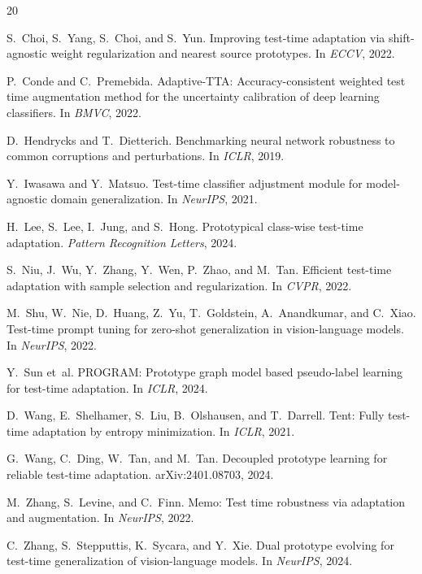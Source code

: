 \documentclass{article}
\begin{document}
\begin{small}
\begin{thebibliography}{20}

S.~Choi, S.~Yang, S.~Choi, and S.~Yun.
\newblock Improving test-time adaptation via shift-agnostic weight regularization and nearest source prototypes.
\newblock In \emph{ECCV}, 2022.

P.~Conde and C.~Premebida.
\newblock Adaptive-TTA: Accuracy-consistent weighted test time augmentation method for the uncertainty calibration of deep learning classifiers.
\newblock In \emph{BMVC}, 2022.

D.~Hendrycks and T.~Dietterich.
\newblock Benchmarking neural network robustness to common corruptions and perturbations.
\newblock In \emph{ICLR}, 2019.

Y.~Iwasawa and Y.~Matsuo.
\newblock Test-time classifier adjustment module for model-agnostic domain generalization.
\newblock In \emph{NeurIPS}, 2021.

H.~Lee, S.~Lee, I.~Jung, and S.~Hong.
\newblock Prototypical class-wise test-time adaptation.
\newblock \emph{Pattern Recognition Letters}, 2024.

S.~Niu, J.~Wu, Y.~Zhang, Y.~Wen, P.~Zhao, and M.~Tan.
\newblock Efficient test-time adaptation with sample selection and regularization.
\newblock In \emph{CVPR}, 2022.

M.~Shu, W.~Nie, D.~Huang, Z.~Yu, T.~Goldstein, A.~Anandkumar, and C.~Xiao.
\newblock Test-time prompt tuning for zero-shot generalization in vision-language models.
\newblock In \emph{NeurIPS}, 2022.

Y.~Sun et~al.
\newblock PROGRAM: Prototype graph model based pseudo-label learning for test-time adaptation.
\newblock In \emph{ICLR}, 2024.

D.~Wang, E.~Shelhamer, S.~Liu, B.~Olshausen, and T.~Darrell.
\newblock Tent: Fully test-time adaptation by entropy minimization.
\newblock In \emph{ICLR}, 2021.

G.~Wang, C.~Ding, W.~Tan, and M.~Tan.
\newblock Decoupled prototype learning for reliable test-time adaptation.
\newblock arXiv:2401.08703, 2024.

M.~Zhang, S.~Levine, and C.~Finn.
\newblock Memo: Test time robustness via adaptation and augmentation.
\newblock In \emph{NeurIPS}, 2022.

C.~Zhang, S.~Stepputtis, K.~Sycara, and Y.~Xie.
\newblock Dual prototype evolving for test-time generalization of vision-language models.
\newblock In \emph{NeurIPS}, 2024.

\end{thebibliography}
\end{small}
\end{document}
